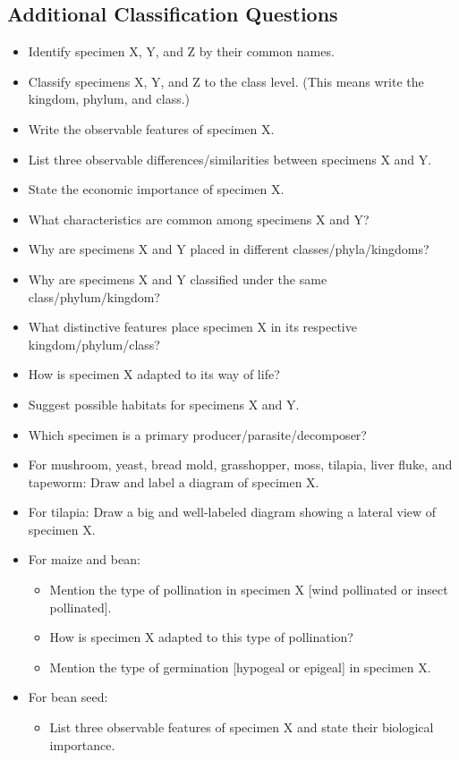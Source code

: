 \subsection{Additional Classification Questions}
\begin{itemize}
\item{Identify specimen X, Y, and Z by their common names.}
\item{Classify specimens X, Y, and Z to the class level. (This means write the kingdom, phylum, and class.)}
\item{Write the observable features of specimen X.}
\item{List three observable differences/similarities between specimens X and Y.}
\item{State the economic importance of specimen X.}
\item{What characteristics are common among specimens X and Y?}
\item{Why are specimens X and Y placed in different classes/phyla/kingdoms?}
\item{Why are specimens X and Y classified under the same class/phylum/kingdom?}
\item{What distinctive features place specimen X in its respective kingdom/phylum/class?}
\item{How is specimen X adapted to its way of life?}
\item{Suggest possible habitats for specimens X and Y.}
\item{Which specimen is a primary producer/parasite/decomposer?}
\item{For mushroom, yeast, bread mold, grasshopper, moss, tilapia, liver fluke, and tapeworm: Draw and label a diagram of specimen X.}
\item{For tilapia: Draw a big and well-labeled diagram showing a lateral view of specimen X.}
\item{For maize and bean:}
\begin{itemize}
\item{Mention the type of pollination in specimen X [wind pollinated or insect pollinated].}
\item{How is specimen X adapted to this type of pollination?}
\item{Mention the type of germination [hypogeal or epigeal] in specimen X.}
\end{itemize}
\item{For bean seed:}
\begin{itemize}
\item{List three observable features of specimen X and state their biological importance.}

\end{itemize}
\end{itemize}
